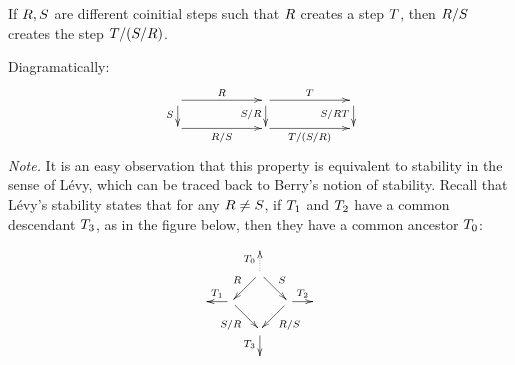 \begin{lemma}[Stability]
If $R,S$ are different coinitial steps such that
$R$ creates a step $T$,
then $R/S$ creates the step $T/(S/R)$.

Diagramatically:
\[
  \xymatrix@R=.5cm@C=2cm{
    \ar[r]^{\redex}
    \ar[d]_{\redextwo}
    &
    \ar[r]^{\redexthree}
    \ar[d]_{\redextwo/\redex}
    &
    \ar[d]_{\redextwo/\redex\redexthree}
  \\
    \ar[r]_{\redex/\redextwo}
    &
    \ar[r]_{\redexthree/(\redextwo/\redex)}
    &
  }
\]
{\em Note.}
It is an easy observation that this property is equivalent to stability in the sense of L\'evy,
which can be traced back to Berry's notion of stability.
Recall that L\'evy's stability states that for any $R \neq S$,
if $T_1$ and $T_2$ have a common descendant $T_3$, as in the figure below,
then they have a common ancestor $T_0$:
\[
  \xymatrix@C=.5cm@R=.5cm{
    &&&
  \\
    &
    & \ar@{.>}[u]^{\redexthree_0} \ar[dl]_{\redex} \ar[dr]^{\redextwo} &
  \\
    &
    \ar[l]_{\redexthree_1}
    \ar[dr]_{\redextwo/\redex} & & \ar[dl]^{\redex/\redextwo} \ar[r]^{\redexthree_2} &
  \\
    &
    & \ar[d]_{\redexthree_3} &
  \\
    &&&
  }
\]
\end{lemma}
